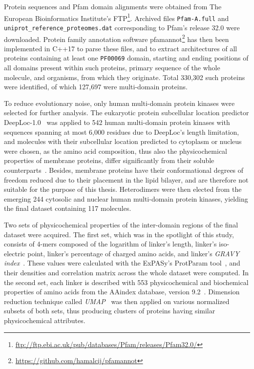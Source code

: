 \label{methods}

Protein sequences and Pfam domain alignments were obtained from The European
Bioinformatics Institute's
FTP\footnote{\url{ftp://ftp.ebi.ac.uk/pub/databases/Pfam/releases/Pfam32.0/}}.
Archived files \texttt{Pfam-A.full} and \texttt{uniprot\_reference\_proteomes.dat}
corresponding to Pfam's release 32.0 were downloaded.
Protein family annotation software
pfamannot\footnote{\url{https://github.com/hamalcij/pfamannot}} has then been implemented
in C++17 to parse these files, and to extract architectures of all proteins containing at
least one \texttt{PF00069} domain, starting and ending positions of all domains present
within such proteins, primary sequence of the whole molecule, and organisms, from which
they originate.
Total 330,302 such proteins were identified, of which 127,697 were multi-domain proteins.

To reduce evolutionary noise, only human multi-domain protein kinases were selected for
further analysis.
The eukaryotic protein subcellular location predictor
DeepLoc-1.0~\cite{almagro2017deeploc} was applied to 542 human multi-domain protein
kinases with sequences spanning at most 6,000 residues due to DeepLoc's length limitation,
and molecules with their subcellular location predicted to cytoplasm or nucleus were
chosen, as the amino acid composition, thus also the physicochemical properties of
membrane proteins, differ significantly from their soluble
counterparts~\cite{capaldi1972low, von1988topogenic, tusnady1998principles}.
Besides, membrane proteins have their conformational degrees of freedom reduced due to
their placement in the lipid bilayer, and are therefore not suitable for the purpose of
this thesis.
Heterodimers were then elected from the emerging 244 cytosolic and nuclear human
multi-domain protein kinases, yielding the final dataset containing 117 molecules.

Two sets of physicochemical properties of the inter-domain regions of the final
dataset were acquired.
The first set, which was in the spotlight of this study, consists of 4-mers composed of
the logarithm of linker's length, linker's iso-electric point, linker's percentage of
charged amino acids, and linker's \emph{GRAVY index}~\cite{kyte1982simple}.
These values were calculated with the ExPASy's ProtParam tool~\cite{gasteiger2005protein},
and their densities and correlation matrix across the whole dataset were computed.
In the second set, each linker is described with 553 physicochemical and
biochemical properties of amino acids from the AAindex database, version
9.2~\cite{nakai1988cluster, tomii1996analysis, kawashima1999aaindex, kawashima2000aaindex,
kawashima2007aaindex}.
Dimension reduction technique called \emph{UMAP}~\cite{mcinnes2018umap} was then applied
on various normalized subsets of both sets, thus producing clusters of proteins having
similar physicochemical attributes.


